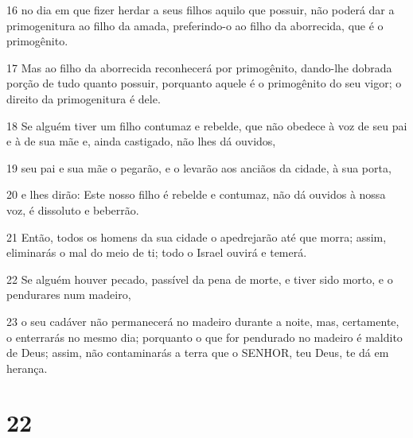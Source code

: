 \par 16 no dia em que fizer herdar a seus filhos aquilo que possuir, não poderá dar a primogenitura ao filho da amada, preferindo-o ao filho da aborrecida, que é o primogênito.
\par 17 Mas ao filho da aborrecida reconhecerá por primogênito, dando-lhe dobrada porção de tudo quanto possuir, porquanto aquele é o primogênito do seu vigor; o direito da primogenitura é dele.
\par 18 Se alguém tiver um filho contumaz e rebelde, que não obedece à voz de seu pai e à de sua mãe e, ainda castigado, não lhes dá ouvidos,
\par 19 seu pai e sua mãe o pegarão, e o levarão aos anciãos da cidade, à sua porta,
\par 20 e lhes dirão: Este nosso filho é rebelde e contumaz, não dá ouvidos à nossa voz, é dissoluto e beberrão.
\par 21 Então, todos os homens da sua cidade o apedrejarão até que morra; assim, eliminarás o mal do meio de ti; todo o Israel ouvirá e temerá.
\par 22 Se alguém houver pecado, passível da pena de morte, e tiver sido morto, e o pendurares num madeiro,
\par 23 o seu cadáver não permanecerá no madeiro durante a noite, mas, certamente, o enterrarás no mesmo dia; porquanto o que for pendurado no madeiro é maldito de Deus; assim, não contaminarás a terra que o SENHOR, teu Deus, te dá em herança.

\chapter{22}

